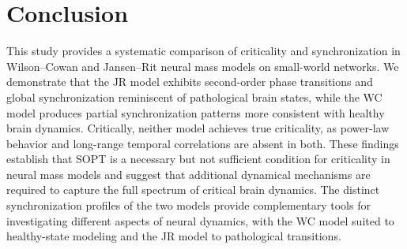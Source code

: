 \documentclass[11pt]{article}
\begin{document}
\section{Conclusion}

This study provides a systematic comparison of criticality and synchronization in Wilson--Cowan and Jansen--Rit neural mass models on small-world networks. We demonstrate that the JR model exhibits second-order phase transitions and global synchronization reminiscent of pathological brain states, while the WC model produces partial synchronization patterns more consistent with healthy brain dynamics. Critically, neither model achieves true criticality, as power-law behavior and long-range temporal correlations are absent in both. These findings establish that SOPT is a necessary but not sufficient condition for criticality in neural mass models and suggest that additional dynamical mechanisms are required to capture the full spectrum of critical brain dynamics. The distinct synchronization profiles of the two models provide complementary tools for investigating different aspects of neural dynamics, with the WC model suited to healthy-state modeling and the JR model to pathological transitions.



\end{document}
